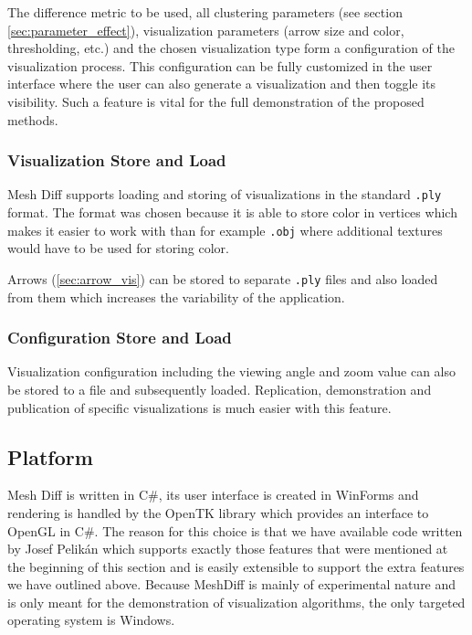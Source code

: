 The difference metric to be used, all clustering parameters (see section \ref{sec:parameter_effect}), visualization parameters (arrow size and color, thresholding, etc.) and the chosen visualization type form a configuration of the visualization process. This configuration can be fully customized in the user interface where the user can also generate a visualization and then toggle its visibility. Such a feature is vital for the full demonstration of the proposed methods.

\subsubsection{Visualization Store and Load}

Mesh Diff supports loading and storing of visualizations in the standard \verb+.ply+ format. The format was chosen because it is able to store color in vertices which makes it easier to work with than for example \verb+.obj+ where additional textures would have to be used for storing color. 

Arrows (\ref{sec:arrow_vis}) can be stored to separate \verb+.ply+ files and also loaded from them which increases the variability of the application.

\subsubsection{Configuration Store and Load}

Visualization configuration including the viewing angle and zoom value can also be stored to a file and subsequently loaded. Replication, demonstration and publication of specific visualizations is much easier with this feature.
\subsection{Platform}

Mesh Diff is written in C\#, its user interface is created in WinForms and rendering is handled by the OpenTK library which provides an interface to OpenGL in C\#. The reason for this choice is that we have available code written by Josef Pelikán which supports exactly those features that were mentioned at the beginning of this section and is easily extensible to support the extra features we have outlined above. Because MeshDiff is mainly of experimental nature and is only meant for the demonstration of visualization algorithms, the only targeted operating system is Windows.